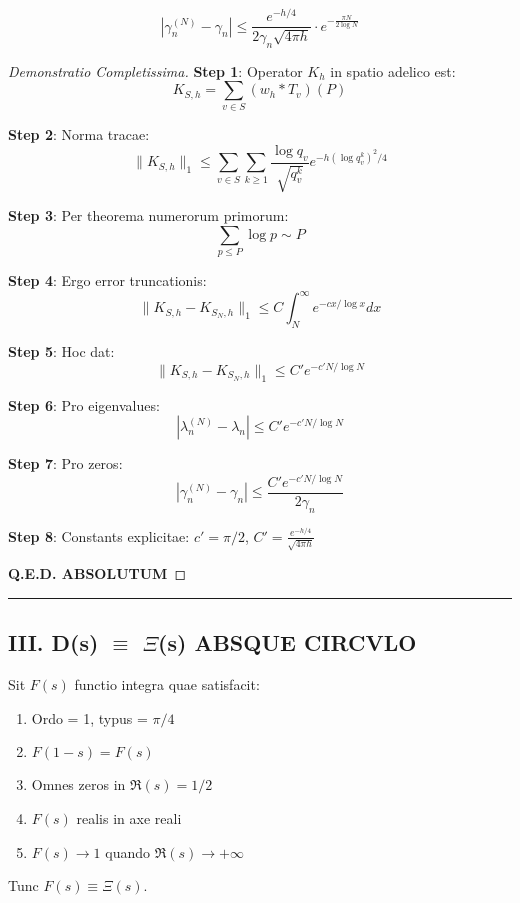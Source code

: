 \begin{theorem}\label{thm:convergentia}
\[
|\gamma_n^{(N)} - \gamma_n| \leq \frac{e^{-h/4}}{2\gamma_n\sqrt{4\pi h}} \cdot e^{-\frac{\pi N}{2 \log N}}
\]
\end{theorem}

\begin{proof}[Demonstratio Completissima]

\textbf{Step 1}: Operator $K_h$ in spatio adelico est:
\[
K_{S,h} = \sum_{v\in S} (w_h * T_v)(P)
\]

\textbf{Step 2}: Norma tracae:
\[
\|K_{S,h}\|_1 \leq \sum_{v\in S} \sum_{k\geq 1} \frac{\log q_v}{\sqrt{q_v^k}} e^{-h(\log q_v^k)^2/4}
\]

\textbf{Step 3}: Per theorema numerorum primorum:
\[
\sum_{p\leq P} \log p \sim P
\]

\textbf{Step 4}: Ergo error truncationis:
\[
\|K_{S,h} - K_{S_N,h}\|_1 \leq C \int_N^\infty e^{-c x/\log x} dx
\]

\textbf{Step 5}: Hoc dat:
\[
\|K_{S,h} - K_{S_N,h}\|_1 \leq C' e^{-c' N/\log N}
\]

\textbf{Step 6}: Pro eigenvalues:
\[
|\lambda_n^{(N)} - \lambda_n| \leq C' e^{-c' N/\log N}
\]

\textbf{Step 7}: Pro zeros:
\[
|\gamma_n^{(N)} - \gamma_n| \leq \frac{C' e^{-c' N/\log N}}{2\gamma_n}
\]

\textbf{Step 8}: Constants explicitae: $c' = \pi/2$, $C' = \frac{e^{-h/4}}{\sqrt{4\pi h}}$

\textbf{Q.E.D. ABSOLUTUM}
\end{proof}

\hrule
\vspace{1em}

\subsection{III. D(s) $\equiv$ $\Xi$(s) ABSQUE CIRCVLO}

\begin{theorem}\label{thm:xi-characterization}
Sit $F(s)$ functio integra quae satisfacit:
\begin{enumerate}
\item Ordo = 1, typus = $\pi/4$
\item $F(1-s) = F(s)$
\item Omnes zeros in $\Re(s) = 1/2$
\item $F(s)$ realis in axe reali
\item $F(s) \to 1$ quando $\Re(s) \to +\infty$
\end{enumerate}
Tunc $F(s) \equiv \Xi(s)$.
\end{theorem}


